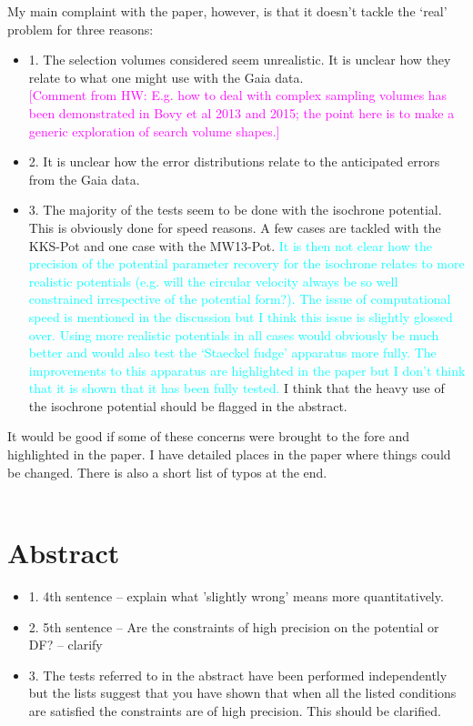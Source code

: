 \documentclass[10pt,a4paper]{article}
\newcommand{\Wilma}[1]{\textcolor{Magenta}{#1}}
\newcommand{\HW}[1]{\textcolor{Cyan}{#1}}
\begin{document}
My main complaint with the paper, however, is that it doesn't tackle the `real'
problem for three reasons:
\begin{itemize}
\item 1. The selection volumes considered seem unrealistic. It is unclear how they relate to what one might use with the Gaia data.\\
\Wilma{[Comment from HW: E.g. how to deal with complex sampling volumes has been demonstrated in Bovy et al 2013 and 2015; the point here is to make a generic exploration of search volume shapes.]}
\item 2. It is unclear how the error distributions relate to the anticipated errors from the Gaia data.
\item 3. The majority of the tests seem to be done with the isochrone potential. This is obviously done for speed reasons. A few cases are tackled with the KKS-Pot and one
case with the MW13-Pot. \HW{It is then not clear how the precision of the potential
parameter recovery for the isochrone relates to more realistic potentials (e.g.
will the circular velocity always be so well constrained irrespective of the
potential form?).} \HW{The issue of computational speed is mentioned in the discussion
but I think this issue is slightly glossed over.} \HW{Using more realistic potentials in all cases would obviously be much better and would also test the `Staeckel fudge'
apparatus more fully.} \HW{The improvements to this apparatus are highlighted in the
paper but I don't think that it is shown that it has been fully tested.} I think
that the heavy use of the isochrone potential should be flagged in the abstract.
\end{itemize}

It would be good if some of these concerns were brought to the fore and highlighted
in the paper. I have detailed places in the paper where things could be changed.
There is also a short list of typos at the end.\\\\


\section{Abstract}
\begin{itemize}
\item 1. 4th sentence -- explain what 'slightly wrong' means more quantitatively.
\item 2. 5th sentence -- Are the constraints of high precision on the potential or DF? -- clarify
\item 3. The tests referred to in the abstract have been performed independently but the lists suggest that you have shown that when all the listed conditions are satisfied the constraints are of high precision. This should be clarified.
\end{itemize}
\end{document}
